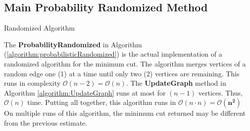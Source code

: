 \documentclass[longpaper, english, final, times]{revdetua}
\begin{document}
		
		\subsection{Main Probability Randomized Method}
			\begin{algorithm}[h]
				\caption{Randomized Algorithm}
				\label{algorithm:probabilisticRandomized}
				\DontPrintSemicolon
				
				
				
				
			\end{algorithm}
			
			The \textbf{ProbabilityRandomized} in Algorithm (\ref{algorithm:probabilisticRandomized}) is the actual implementation of a randomized algorithm for the minimum cut. The algorithm merges vertices of a random edge one (1) at a time until only two (2) vertices are remaining. This runs in complexity $\mathcal{O}(n-2)=\mathcal{O}(n)$. The \textbf{UpdateGraph} method in Algorithm \ref{algorithm:UpdateGraph} runs at most for $(n-1)$ vertices. Thus, $\mathcal{O}(n)$ time. Putting all together, this algorithm runs in $\mathcal{O}(n\cdot n)=\mathbf{\mathcal{O}(n^2)}$\\
			
			On multiple runs of this algorithm, the minimum cut returned may be different from the previous estimate.\\
		
\end{document}
